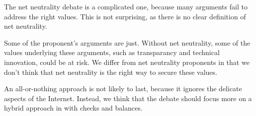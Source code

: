 The net neutrality debate is a complicated one, because many arguments fail to address the right values. This is not surprising, as there is no clear definition of net neutrality.

Some of the proponent's arguments are just. Without net neutrality, some of the values underlying these arguments, such as transparancy and technical innovation, could be at risk. We differ from net neutrality proponents in that we don't think that net neutrality is the right way to secure these values.

An all-or-nothing approach is not likely to last, because it ignores the delicate aspects of the Internet. Instead, we think that the debate should focus more on a hybrid approach in with checks and balances.
